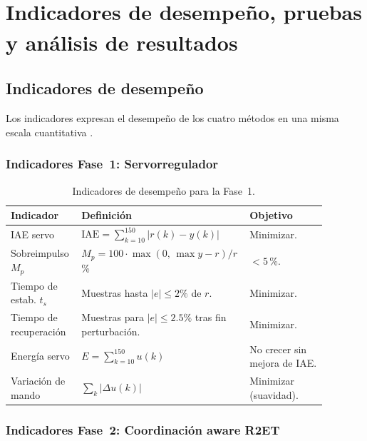 \chapter[Indicadores, pruebas y resultados]{Indicadores de desempeño, pruebas y análisis de resultados\textsuperscript{\normalfont *}}
\label{ch:pruebas}
\begingroup\renewcommand\thefootnote{*}\renewcommand{}\endgroup

\section{Indicadores de desempeño}

Los indicadores expresan el desempeño de los cuatro métodos en una misma escala cuantitativa \cite{martinRodellarControlAdaptativo}.

\subsection*{Indicadores Fase~1: Servorregulador}

\begin{table}[H]
\centering
\caption{Indicadores de desempeño para la Fase~1.}
\label{tab:indicadores_servo}
\begin{tabular}{@{}P{0.22\linewidth}P{0.42\linewidth}P{0.24\linewidth}@{}}
\toprule
Indicador & Definición & Objetivo \\ \midrule
IAE servo & $\text{IAE} = \sum_{k=10}^{150}|r(k)-y(k)|$ & Minimizar.\\
Sobreimpulso $M_p$ & $M_p = 100\cdot\max(0,\,\max y - r)/r$\,\% & $< 5$\,\%.\\
Tiempo de estab. $t_s$ & Muestras hasta $|e| \leq 2\%$ de $r$. & Minimizar.\\
Tiempo de recuperación & Muestras para $|e| \leq 2.5\%$ tras fin perturbación. & Minimizar.\\
Energía servo & $E = \sum_{k=10}^{150}u(k)$ & No crecer sin mejora de IAE.\\
Variación de mando & $\sum_{k}|\Delta u(k)|$ & Minimizar (suavidad).\\
\bottomrule
\end{tabular}
\end{table}

\subsection*{Indicadores Fase~2: Coordinación aware R2ET}

